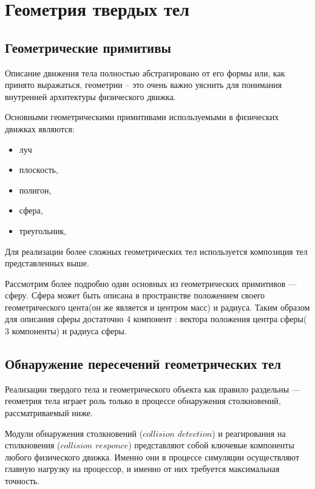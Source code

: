 \chapter{Геометрия твердых тел}
\section{Геометрические примитивы}
Описание движения тела полностью абстрагировано от его формы
или, как принято выражаться, геометрии – это очень важно
уяснить для понимания внутренней архитектуры физического
движка.

Основными геометрическими примитивами используемыми в физических движках являются:
\begin{itemize}
 \item  луч 
 \item  плоскость,
 \item  полигон,
 \item  сфера,
 \item  треугольник,
 \end{itemize}
Для реализации более сложных геометрических тел используется композиция тел представленных выше.

Рассмотрим более подробно один основных из геометрических примитивов --- сферу.
Сфера может быть описана в пространстве положением своего геометрического цента(он же является и центром масс)
и радиуса. Таким образом для описания сферы достаточно 4 компонент : вектора положения центра сферы( 3 компоненты) и радиуса сферы.


\section{Обнаружение пересечений геометрических тел}
Реализации твердого тела и геометрического объекта как правило раздельны --- геометрия тела играет роль только в
процессе обнаружения столкновений, рассматриваемый ниже.

Модули обнаружения столкновений ($collision$ $detection$) и реагирования на столкновения ($collision$ $responce$) представляют 
собой ключевые компоненты любого физического движка. Именно они в процессе симуляции осуществляют главную нагрузку на
процессор, и именно от них требуется максимальная точность.

